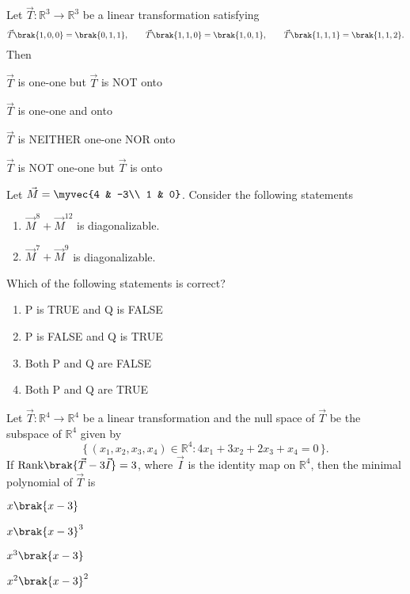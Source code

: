 \item Let $\vec{T} : \mathbb{R}^{3}\to \mathbb{R}^{3}$ be a linear transformation satisfying
\[
\vec{T}\brak{1,0,0}=\brak{0,1,1},\qquad
\vec{T}\brak{1,1,0}=\brak{1,0,1},\qquad
\vec{T}\brak{1,1,1}=\brak{1,1,2}.
\]
Then
\hfill{}
\begin{enumerate}
\begin{multicols}{2}
\item $\vec{T}$ is one\mbox{-}one but $\vec{T}$ is NOT onto
\item $\vec{T}$ is one\mbox{-}one and onto
\item $\vec{T}$ is NEITHER one\mbox{-}one NOR onto
\item $\vec{T}$ is NOT one\mbox{-}one but $\vec{T}$ is onto
\end{multicols}
\end{enumerate}
%
\item Let $\vec{M}=\myvec{4 & -3\\ 1 & 0}$. Consider the following statements
\begin{enumerate}[label=\Alph*:,start=16]
	\item  $\vec{M}^{8}+\vec{M}^{12}$ is diagonalizable.
	\item  $\vec{M}^{7}+\vec{M}^{9}$ is diagonalizable.
\end{enumerate}
Which of the following statements is correct?
\hfill{}
\begin{multicols}{2}
\begin{enumerate}
\item P is TRUE and Q is FALSE
\item P is FALSE and Q is TRUE
\item Both P and Q are FALSE
\item Both P and Q are TRUE
\end{enumerate}
\end{multicols}
\item Let $\vec{T} : \mathbb{R}^{4}\to \mathbb{R}^{4}$ be a linear transformation and the null space of $\vec{T}$ be the subspace of $\mathbb{R}^{4}$ given by
\[
\{\, (x_{1},x_{2},x_{3},x_{4})\in \mathbb{R}^{4} : 4x_{1}+3x_{2}+2x_{3}+x_{4}=0 \,\}.
\]
If $\operatorname{Rank}\!\brak{\vec{T}-3\vec{I}}=3$, where $\vec{I}$ is the identity map on $\mathbb{R}^{4}$, then the minimal polynomial of $\vec{T}$ is
\hfill{}
\begin{enumerate}
\begin{multicols}{4}
\item $x\brak{x-3}$
\item $x\brak{x-3}^{3}$
\item $x^{3}\brak{x-3}$
\item $x^{2}\brak{x-3}^{2}$
\end{multicols}
\end{enumerate}

